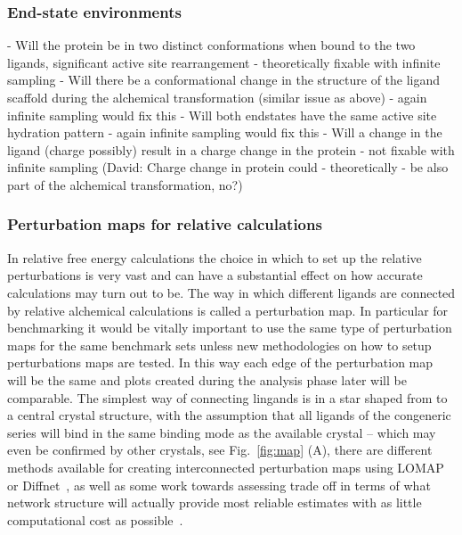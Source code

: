 \documentclass[9pt,bestpractices]{livecoms}
\begin{document}
\subsubsection{End-state environments}
- Will the protein be in two distinct conformations when bound to the two ligands, significant active site rearrangement - theoretically fixable with infinite sampling
- Will there be a conformational change in the structure of the ligand scaffold during the alchemical transformation (similar issue as above)  - again infinite sampling would fix this
- Will both endstates have the same active site hydration pattern - again infinite sampling would fix this
- Will a change in the ligand (charge possibly) result in a charge change in the protein - not fixable with infinite sampling (David: Charge change in protein could - theoretically - be also part of the alchemical transformation, no?)

\subsubsection{Perturbation maps for relative calculations}
In relative free energy calculations the choice in which to set up the relative perturbations is very vast and can have a substantial effect on how accurate calculations may turn out to be. The way in which different ligands are connected by relative alchemical calculations is called a perturbation map. In particular for benchmarking it would be vitally important to use the same type of perturbation maps for the same benchmark sets unless new methodologies on how to setup perturbations maps are tested. In this way each edge of the perturbation map will be the same and plots created during the analysis phase later will be comparable. The simplest way of connecting lingands is in a star shaped from to a central crystal structure, with the assumption that all ligands of the congeneric series will bind in the same binding mode as the available crystal -- which may even be confirmed by other crystals, see Fig.~\ref{fig:map} (A), there are different methods available for creating interconnected perturbation maps using LOMAP~\cite{} or Diffnet~\cite{}, as well as some work towards assessing trade off in terms of what network structure will actually provide most reliable estimates with as little computational cost as possible~\cite{}.
\end{document}
